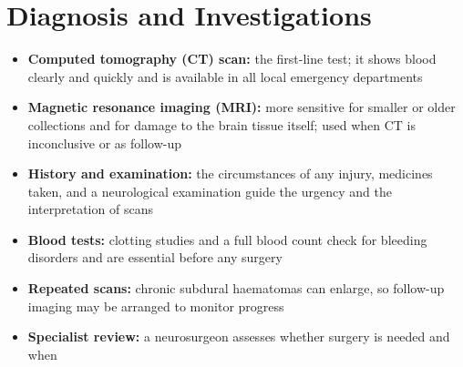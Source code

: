 \section*{Diagnosis and Investigations}
\begin{itemize}
    \item \textbf{Computed tomography (CT) scan:} the first-line test; it shows blood clearly and quickly and is available in all local emergency departments
    \item \textbf{Magnetic resonance imaging (MRI):} more sensitive for smaller or older collections and for damage to the brain tissue itself; used when CT is inconclusive or as follow-up
    \item \textbf{History and examination:} the circumstances of any injury, medicines taken, and a neurological examination guide the urgency and the interpretation of scans
    \item \textbf{Blood tests:} clotting studies and a full blood count check for bleeding disorders and are essential before any surgery
    \item \textbf{Repeated scans:} chronic subdural haematomas can enlarge, so follow-up imaging may be arranged to monitor progress
    \item \textbf{Specialist review:} a neurosurgeon assesses whether surgery is needed and when
\end{itemize}

